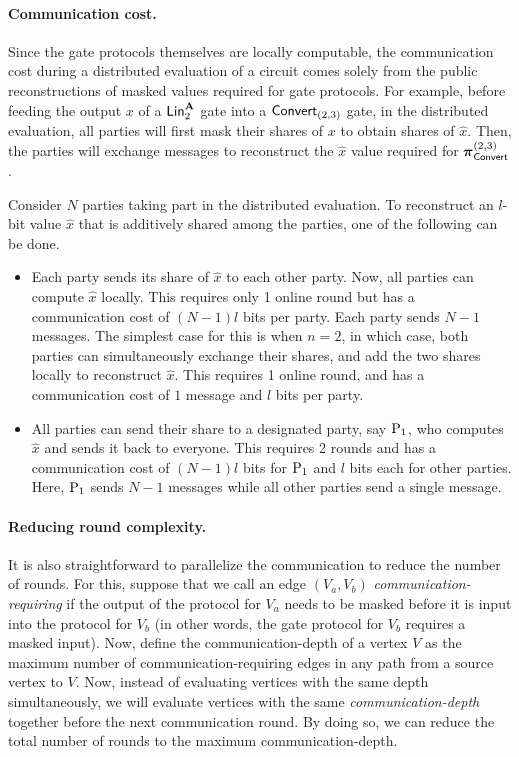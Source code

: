 \paragraph{Communication cost.}
Since the gate protocols themselves are locally computable, the communication cost during a distributed evaluation of a circuit comes solely from the public reconstructions of masked values required for gate protocols. For example, before feeding the output $x$ of a $\LMap^{\mat{A}}_2$ gate into a $\textnormal{\textsf{Convert}}_{(2,3)}$ gate, in the distributed evaluation, all parties will first mask their shares of $x$ to obtain shares of $\hat{x}$. Then, the parties will exchange messages to reconstruct the $\hat{x}$ value required for $\boldsymbol{\pi}_{\textnormal{\textsf{Convert}}}^{(2,3)}$.

Consider $N$ parties taking part in the distributed evaluation. To reconstruct an $l$-bit value $\hat{x}$ that is additively shared among the parties, one of the following can be done.
\begin{itemize}
  \item Each party sends its share of $\hat{x}$ to each other party. Now, all parties can compute $\hat{x}$ locally. This requires only 1 online round but has a communication cost of $(N-1)l$ bits per party. Each party sends $N-1$ messages. The simplest case for this is when $n=2$, in which case, both parties can simultaneously exchange their shares, and add the two shares locally to reconstruct $\hat{x}$. This requires 1 online round, and has a communication cost of $1$ message and $l$ bits per party. 

  \item All parties can send their share to a designated party, say $\textnormal{P}_1$, who computes $\hat{x}$ and sends it back to everyone. This requires 2 rounds and has a communication cost of $(N-1)l$ bits for $\textnormal{P}_1$ and $l$ bits each for other parties. Here, $\textnormal{P}_1$ sends $N-1$ messages while all other parties send a single message.
\end{itemize}


\paragraph{Reducing round complexity.} It is also straightforward to parallelize the communication to reduce the number of rounds. For this, suppose that we call an edge $(V_a, V_b)$ \textit{communication-requiring} if the output of the protocol for $V_a$ needs to be masked before it is input into the protocol for $V_b$ (in other words, the gate protocol for $V_b$ requires a masked input). Now, define the communication-depth of a vertex $V$ as the maximum number of communication-requiring edges in any path from a source vertex to $V$. Now, instead of evaluating vertices with the same depth simultaneously, we will evaluate vertices with the same \textit{communication-depth} together before the next communication round. By doing so, we can reduce the total number of rounds to the maximum communication-depth.


